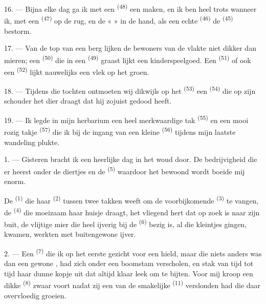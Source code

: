 \VUsaut{3.0mm}

16. --- Bijna elke dag ga ik met een  \textsuperscript{(48)} een
 maken, en ik ben heel trots wanneer ik, met een 
\textsuperscript{(47)} op de rug, en de «  » in de hand, als een echte
 \textsuperscript{(46)} de  \textsuperscript{(45)} bestorm.

17. --- Van de top van een berg lijken de bewoners van de vlakte niet dikker dan mieren; een
 \textsuperscript{(50)} die in een
 \textsuperscript{(49)} graast lijkt een kinderspeelgoed. Een
 \textsuperscript{(51)} of ook een 
\textsuperscript{(52)} lijkt nauwelijks een vlek op het groen.

18. --- Tijdens die tochten ontmoeten wij dikwijls op het  \textsuperscript{(53)}
een  \textsuperscript{(54)} die op zijn schouder het dier draagt dat hij
zojuist gedood heeft.

19. --- Ik legde in mijn herbarium een heel merkwaardige tak 
\textsuperscript{(55)} en een mooi rozig takje  \textsuperscript{(57)} die ik
bij de ingang van een kleine  \textsuperscript{(56)} tijdens mijn laatste
wandeling plukte.

\VUsaut{3.0mm}
\VUsaut{3.0mm}

\VUsaut{3.0mm}

1. --- Gisteren bracht ik een heerlijke dag in het woud door. De bedrijvigheid die er heerst
onder de diertjes en de  \textsuperscript{(5)} waardoor het bewoond wordt
boeide mij enorm.

De  \textsuperscript{(1)} die haar  \textsuperscript{(2)} tussen twee
takken weeft om de voorbijkomende
 \textsuperscript{(3)} te vangen, de 
\textsuperscript{(4)} die moeizaam haar huisje draagt, het vliegend hert dat op zoek is naar
zijn buit, de vlijtige mier die heel ijverig bij de
 \textsuperscript{(6)} bezig is, al die kleintjes gingen,
kwamen, werkten met buitengewone ijver.

2. --- Een  \textsuperscript{(7)} die ik op het eerste gezicht voor een
 hield, maar die niets anders was dan een gewone
, had zich onder een boomstam verscholen, en stak van tijd tot
tijd haar dunne kopje uit dat altijd klaar leek om te bijten. Voor mij kroop een dikke
 \textsuperscript{(8)} zwaar voort nadat zij een van de smakelijke
 \textsuperscript{(11)} verslonden had die daar overvloedig groeien.

